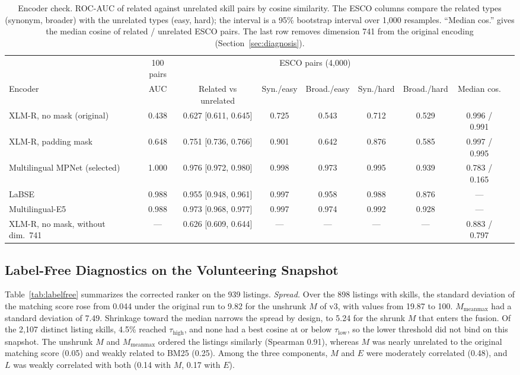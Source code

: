 \documentclass[CHICAGO]{USG}
\begin{document}
\begin{table}[!t]
\caption{Encoder check. ROC-AUC of related against unrelated skill pairs by cosine similarity. The ESCO columns compare the related types (synonym, broader) with the unrelated types (easy, hard); the interval is a 95\% bootstrap interval over 1{,}000 resamples. ``Median cos.'' gives the median cosine of related / unrelated ESCO pairs. The last row removes dimension 741 from the original encoding (Section~\ref{sec:diagnosis}).}
\label{tab:encoder}
\centering
\footnotesize
\begin{tabular}{lcccccccc}
\toprule
 & 100 pairs & \multicolumn{5}{c}{ESCO pairs (4{,}000)} & \\
\cmidrule(lr){3-7}
Encoder & AUC & Related vs unrelated & Syn./easy & Broad./easy & Syn./hard & Broad./hard & Median cos. \\
\midrule
XLM-R, no mask (original) & 0.438 & 0.627 [0.611, 0.645] & 0.725 & 0.543 & 0.712 & 0.529 & 0.996 / 0.991 \\
XLM-R, padding mask & 0.648 & 0.751 [0.736, 0.766] & 0.901 & 0.642 & 0.876 & 0.585 & 0.997 / 0.995 \\
Multilingual MPNet (selected) & 1.000 & 0.976 [0.972, 0.980] & 0.998 & 0.973 & 0.995 & 0.939 & 0.783 / 0.165 \\
LaBSE & 0.988 & 0.955 [0.948, 0.961] & 0.997 & 0.958 & 0.988 & 0.876 & --- \\
Multilingual-E5 & 0.988 & 0.973 [0.968, 0.977] & 0.997 & 0.974 & 0.992 & 0.928 & --- \\
\midrule
XLM-R, no mask, without dim.\ 741 & --- & 0.626 [0.609, 0.644] & --- & --- & --- & --- & 0.883 / 0.797 \\
\bottomrule
\end{tabular}
\end{table}

\subsection{Label-Free Diagnostics on the Volunteering Snapshot}
\label{sec:res-labelfree}
Table~\ref{tab:labelfree} summarizes the corrected ranker on the 939 listings. %
\emph{Spread.} Over the 898 listings with skills, the standard deviation of the matching score rose from 0.044 under the original run to 9.82 for the unshrunk $M$ of v3, with values from 19.87 to 100. $M_{\mathrm{meanmax}}$ had a standard deviation of 7.49. Shrinkage toward the median narrows the spread by design, to 5.24 for the shrunk $M$ that enters the fusion. %
Of the 2{,}107 distinct listing skills, 4.5\% reached $\tau_{\mathrm{high}}$, and none had a best cosine at or below $\tau_{\mathrm{low}}$, so the lower threshold did not bind on this snapshot. %
The unshrunk $M$ and $M_{\mathrm{meanmax}}$ ordered the listings similarly (Spearman 0.91), whereas $M$ was nearly unrelated to the original matching score (0.05) and weakly related to BM25 (0.25). %
Among the three components, $M$ and $E$ were moderately correlated (0.48), and $L$ was weakly correlated with both (0.14 with $M$, 0.17 with $E$). %
\end{document}

